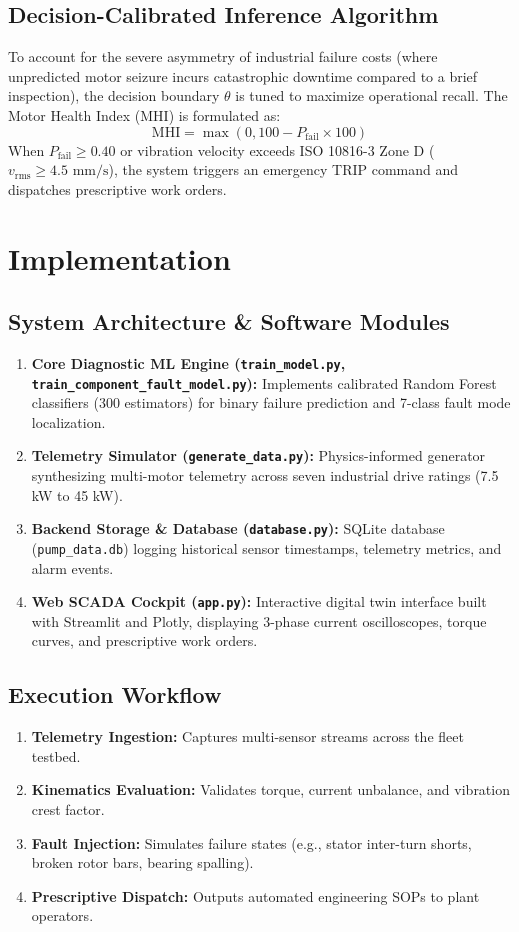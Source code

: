 \documentclass[conference]{IEEEtran}
\begin{document}
\subsection{Decision-Calibrated Inference Algorithm}
To account for the severe asymmetry of industrial failure costs (where unpredicted motor seizure incurs catastrophic downtime compared to a brief inspection), the decision boundary $\theta$ is tuned to maximize operational recall. The Motor Health Index (MHI) is formulated as:
\begin{equation}
\text{MHI} = \max(0, 100 - P_{\text{fail}} \times 100)
\end{equation}
When $P_{\text{fail}} \ge 0.40$ or vibration velocity exceeds ISO 10816-3 Zone D ($v_{\text{rms}} \ge 4.5\text{ mm/s}$), the system triggers an emergency TRIP command and dispatches prescriptive work orders.

\section{Implementation}
\subsection{System Architecture \& Software Modules}
\begin{enumerate}
    \item \textbf{Core Diagnostic ML Engine (\texttt{train\_model.py}, \texttt{train\_component\_fault\_model.py}):} Implements calibrated Random Forest classifiers (300 estimators) for binary failure prediction and 7-class fault mode localization.
    \item \textbf{Telemetry Simulator (\texttt{generate\_data.py}):} Physics-informed generator synthesizing multi-motor telemetry across seven industrial drive ratings (7.5 kW to 45 kW).
    \item \textbf{Backend Storage \& Database (\texttt{database.py}):} SQLite database (\texttt{pump\_data.db}) logging historical sensor timestamps, telemetry metrics, and alarm events.
    \item \textbf{Web SCADA Cockpit (\texttt{app.py}):} Interactive digital twin interface built with Streamlit and Plotly, displaying 3-phase current oscilloscopes, torque curves, and prescriptive work orders.
\end{enumerate}

\subsection{Execution Workflow}
\begin{enumerate}
    \item \textbf{Telemetry Ingestion:} Captures multi-sensor streams across the fleet testbed.
    \item \textbf{Kinematics Evaluation:} Validates torque, current unbalance, and vibration crest factor.
    \item \textbf{Fault Injection:} Simulates failure states (e.g., stator inter-turn shorts, broken rotor bars, bearing spalling).
    \item \textbf{Prescriptive Dispatch:} Outputs automated engineering SOPs to plant operators.
\end{enumerate}
\end{document}
